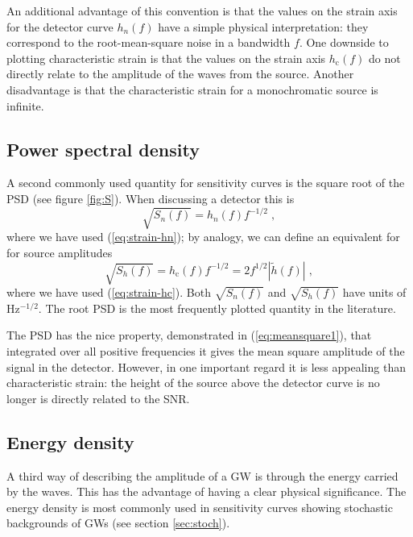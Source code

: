 An additional advantage of this convention is that the values on the strain axis for the detector curve $h_n(f)$ have a simple physical interpretation: they correspond to the root-mean-square noise in a bandwidth $f$. One downside to plotting characteristic strain is that the values on the strain axis $h_\mathrm{c}(f)$ do not directly relate to the amplitude of the waves from the source. Another disadvantage is that the characteristic strain for a monochromatic source is infinite.

\subsection{Power spectral density }\label{sec:psd}

A second commonly used quantity for sensitivity curves is the square root of the PSD (see figure \ref{fig:S}). When discussing a detector this is
\begin{equation}\label{eq:temp1}
\sqrt{S_{n}(f)} = h_{n}(f)f^{-1/2} \; ,
\end{equation}
where we have used (\ref{eq:strain-hn}); by analogy, we can define an equivalent for for source amplitudes
\begin{equation}
\sqrt{S_{h}(f)} = h_\mathrm{c}(f)f^{-1/2} = 2 f^{1/2} \left| \tilde{h}(f) \right| \; ,
\label{eq:ShforSources}
\end{equation}
where we have used (\ref{eq:strain-hc}). Both $\sqrt{S_{n}(f)}$ and $\sqrt{S_{h}(f)}$ have units of $\mathrm{Hz^{-1/2}}$. The root PSD is the most frequently plotted quantity in the literature.

The PSD has the nice property, demonstrated in (\ref{eq:meansquare1}), that integrated over all positive frequencies it gives the mean square amplitude of the signal in the detector. However, in one important regard it is less appealing than characteristic strain: the height of the source above the detector curve is no longer is directly related to the SNR.


\subsection{Energy density}\label{sec:energy-density}

A third way of describing the amplitude of a GW is through the energy carried by the waves. This has the advantage of having a clear physical significance. The energy density is most commonly used in sensitivity curves showing stochastic backgrounds of GWs (see section \ref{sec:stoch}).

